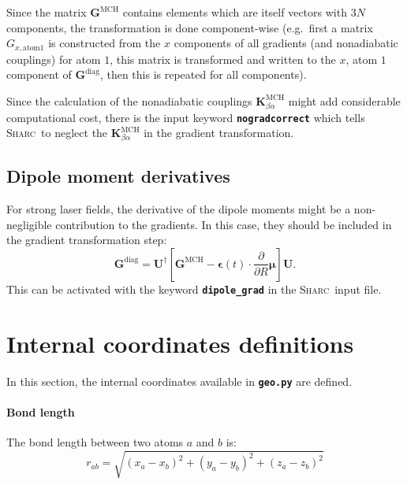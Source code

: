 \documentclass[a4paper,10pt,DIV=15,openany]{scrbook}
\newcommand{\sharc}{\textsc{Sharc}}
\newcommand{\ttt}[1]{\textbf{\texttt{#1}}}
\newcommand{\VEC}[1]{\ensuremath{\mathbf{#1}}}
\begin{document}
Since the matrix $\VEC{G}^{\text{MCH}}$ contains elements which are itself vectors with $3N$ components, the transformation is done component-wise (e.g.\ first a matrix $G_{x,\text{atom} 1}$ is constructed from the $x$ components of all gradients (and nonadiabatic couplings) for atom $1$, this matrix is transformed and written to the $x$, atom $1$ component of $\VEC{G}^{\text{diag}}$, then this is repeated for all components).

Since the calculation of the nonadiabatic couplings $\VEC{K}^{\text{MCH}}_{\beta\alpha}$ might add considerable computational cost, there is the input keyword \ttt{nogradcorrect} which tells \sharc\ to neglect the $\VEC{K}^{\text{MCH}}_{\beta\alpha}$ in the gradient transformation.

\subsection{Dipole moment derivatives}\label{met:dipolegrad}

For strong laser fields, the derivative of the dipole moments might be a non-negligible contribution to the gradients. In this case, they should be included in the gradient transformation step:
\begin{equation}
  \VEC{G}^{\text{diag}}=\VEC{U}^\dagger
  \left[
    \VEC{G}^{\text{MCH}}
    -\boldsymbol{\epsilon}(t)\cdot\frac{\partial}{\partial R}\boldsymbol{\mu}
  \right]\VEC{U}.
\end{equation}
This can be activated with the keyword \ttt{dipole\_grad} in the \sharc\ input file.



\section{Internal coordinates definitions}\label{met:geo}

In this section, the internal coordinates available in \ttt{geo.py} are defined.

\paragraph{Bond length}

The bond length between two atoms $a$ and $b$ is:
\begin{equation}
  r_{ab}=
  \sqrt{
    (x_a-x_b)^2+(y_a-y_b)^2+(z_a-z_b)^2
  }
\end{equation}
\end{document}
